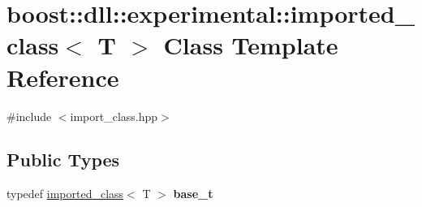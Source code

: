\hypertarget{a00155}{}\section{boost\+:\+:dll\+:\+:experimental\+:\+:imported\+\_\+class$<$ T $>$ Class Template Reference}
\label{a00155}


{\ttfamily \#include $<$import\+\_\+class.\+hpp$>$}

\subsection*{Public Types}
\begin{DoxyCompactItemize}
\item 
typedef \hyperlink{a00155}{imported\+\_\+class}$<$ T $>$ {\bfseries base\+\_\+t}\hypertarget{a00155_acc2cfce842c9bac2feccb2a601f8bdc7}{}\label{a00155_acc2cfce842c9bac2feccb2a601f8bdc7}

\end{DoxyCompactItemize}
